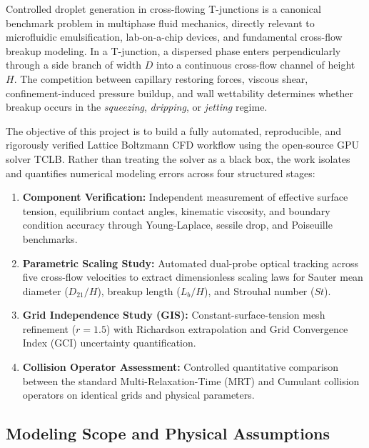 \documentclass[11pt,a4paper]{article}
\begin{document}
Controlled droplet generation in cross-flowing T-junctions is a canonical benchmark problem in multiphase fluid mechanics, directly relevant to microfluidic emulsification, lab-on-a-chip devices, and fundamental cross-flow breakup modeling. In a T-junction, a dispersed phase enters perpendicularly through a side branch of width $D$ into a continuous cross-flow channel of height $H$. The competition between capillary restoring forces, viscous shear, confinement-induced pressure buildup, and wall wettability determines whether breakup occurs in the \emph{squeezing}, \emph{dripping}, or \emph{jetting} regime.

The objective of this project is to build a fully automated, reproducible, and rigorously verified Lattice Boltzmann CFD workflow using the open-source GPU solver TCLB. Rather than treating the solver as a black box, the work isolates and quantifies numerical modeling errors across four structured stages:
\begin{enumerate}
    \item \textbf{Component Verification:} Independent measurement of effective surface tension, equilibrium contact angles, kinematic viscosity, and boundary condition accuracy through Young-Laplace, sessile drop, and Poiseuille benchmarks.
    \item \textbf{Parametric Scaling Study:} Automated dual-probe optical tracking across five cross-flow velocities to extract dimensionless scaling laws for Sauter mean diameter ($D_{21}/H$), breakup length ($L_b/H$), and Strouhal number ($St$).
    \item \textbf{Grid Independence Study (GIS):} Constant-surface-tension mesh refinement ($r = 1.5$) with Richardson extrapolation and Grid Convergence Index (GCI) uncertainty quantification.
    \item \textbf{Collision Operator Assessment:} Controlled quantitative comparison between the standard Multi-Relaxation-Time (MRT) and Cumulant collision operators on identical grids and physical parameters.
\end{enumerate}

\subsection{Modeling Scope and Physical Assumptions}
\end{document}
